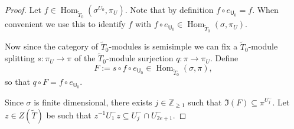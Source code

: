 \documentclass[10pt, letterpaper]{amsart}
\theoremstyle{plain}
\theoremstyle{definition}
\numberwithin{equation}{section}
\newcommand{\Tt}{\widetilde{T}}
\newcommand{\Hom}{\operatorname{Hom}}
\newcommand{\Uf}{\mathsf{U}}
\begin{document}
\begin{proof}
	Let $f\in \Hom_{\Tt_{0}}(\sigma^{U_{0}},\pi_{U})$. Note that by definition $f\circ e_{{\Uf}_{0}}=f$. When convenient we use this to identify $f$ with $f\circ e_{{\Uf}_{0}}\in \Hom_{\Tt_{0}}(\sigma,\pi_{U})$.
	
	Now since the category of $\Tt_{0}$-modules is semisimple we can fix a $\Tt_{0}$-module splitting $s:\pi_{U}\rightarrow \pi$ of the $\Tt_{0}$-module surjection $q:\pi\rightarrow \pi_{U}$. Define 
    \[
    F:=s\circ f\circ e_{{\Uf}_{0}}\in \Hom_{\Tt_{0}}(\sigma,\pi),
    \]
    so that $q\circ F=f\circ e_{{\Uf}_{0}}$.
	
	Since $\sigma$ is finite dimensional, there exists $j\in \mathbb{Z}_{\geq 1}$ such that $\Im(F)\subseteq \pi^{U^{-}_{j}}$. Let $z\in Z(\Tt)$ be such that $z^{-1}U^{-}_{1}z\subseteq U^{-}_{j}\cap U^{-}_{2e+1}$.


\end{proof}
\end{document}
